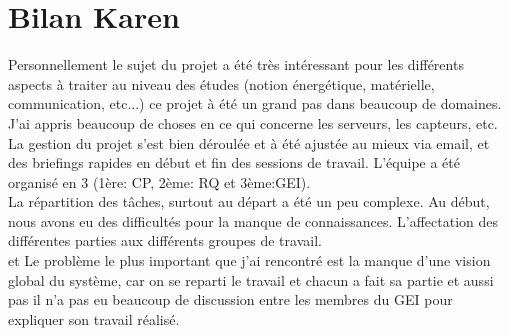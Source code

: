 \documentclass [a4paper] {report}
\begin{document}
\section{Bilan Karen}


Personnellement le sujet du projet a été très intéressant pour les différents
aspects à traiter au niveau des études (notion énergétique, matérielle, communication, etc...)
ce projet à été un grand pas dans beaucoup de domaines. 
J'ai appris beaucoup de choses en ce qui concerne les serveurs, les capteurs, etc.\\

La gestion du projet s'est bien déroulée et à été ajustée au mieux
via email, et des briefings rapides en début et fin des sessions de travail.
L'équipe a été organisé en 3 (1ère: CP, 2ème: RQ et 3ème:GEI).\\

La répartition des tâches, surtout au départ a été un peu complexe. Au début, nous avons eu des difficultés pour la manque de connaissances. L'affectation des différentes parties aux différents groupes de travail.\\
et Le problème le plus important que j'ai rencontré est la manque d'une 
vision global du système, car on se reparti le travail et chacun a fait sa partie 
et aussi pas il n'a pas eu beaucoup de discussion entre les membres du GEI pour expliquer son travail réalisé.
\end{document}
